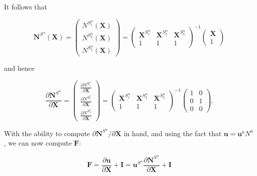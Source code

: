 \documentclass{article}
\begin{document}
It follows that

\begin{equation}
\mathbf{N}^{S^{\alpha}}(\mathbf{X})
=
\begin{pmatrix} N^{S^{\alpha}_1}(\mathbf{X}) \\ N^{S^{\alpha}_2}(\mathbf{X}) \\ N^{S^{\alpha}_3}(\mathbf{X}) \end{pmatrix}
=
\begin{pmatrix} \mathbf{X}^{S^{\alpha}_1} & \mathbf{X}^{S^{\alpha}_2} & \mathbf{X}^{S^{\alpha}_3} \\ 1 & 1 & 1 \end{pmatrix}^{-1}
\begin{pmatrix} \mathbf{X} \\ 1 \end{pmatrix}
\end{equation}

and hence

\begin{equation}
\frac{\partial \mathbf{N}^{S^{\alpha}}}{\partial \mathbf{X}}
=
\begin{pmatrix} \frac{\partial N^{S^{\alpha}_1}}{\partial \mathbf{X}} \\ \frac{\partial N^{S^{\alpha}_2}}{\partial \mathbf{X}} \\ \frac{\partial N^{S^{\alpha}_3}}{\partial \mathbf{X}} \end{pmatrix}
=
\begin{pmatrix} \mathbf{X}^{S^{\alpha}_1} & \mathbf{X}^{S^{\alpha}_2} & \mathbf{X}^{S^{\alpha}_3} \\ 1 & 1 & 1 \end{pmatrix}^{-1}
\begin{pmatrix} 1 & 0 \\ 0 & 1 \\ 0 & 0 \end{pmatrix}.
\end{equation}

With the ability to compute \(\partial \mathbf{N}^{S^{\alpha}} / \partial \mathbf{X}\) in hand, and using the fact that \(\mathbf{u} = \mathbf{u}^a N^a\), we can now compute \(\mathbf{F}\):

\begin{equation}\label{F}
\mathbf{F} = \frac{\partial \mathbf{u}}{\partial \mathbf{X}} + \mathbf{I}
           = \mathbf{u}^{S^{\alpha}} \frac{\partial \mathbf{N}^{S^{\alpha}}}{\partial \mathbf{X}} + \mathbf{I}
\end{equation}
\end{document}
